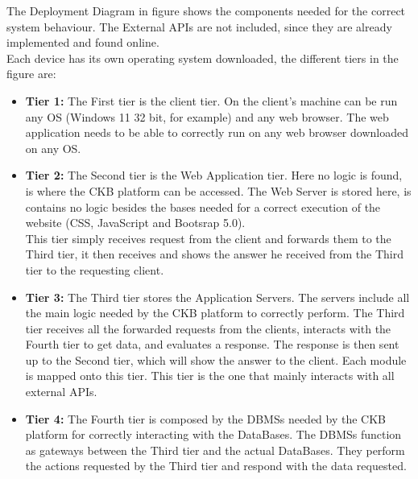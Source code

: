 \documentclass{article}
\begin{document}
{The Deployment Diagram in figure shows the components needed for the correct system behaviour. The External APIs are not included, since they 
are already implemented and found online.\\
Each device has its own operating system downloaded, the different tiers in the figure are:
\begin{itemize}
\item \textbf{Tier 1:} The First tier is the client tier. On the client's machine can be run any OS (Windows 11 32 bit, for example) and any web browser. The web application
needs to be able to correctly run on any web browser downloaded on any OS.\\
\item \textbf{Tier 2:} The Second tier is the Web Application tier. Here no logic is found, is where the CKB platform can be accessed.
The Web Server is stored here, is contains no logic besides the bases needed for a correct execution of the website (CSS, JavaScript and Bootsrap 5.0). \\
This tier simply receives request from the client and forwards them to the Third tier, it then receives and shows the answer he received from the Third tier
to the requesting client. \\
\item \textbf{Tier 3:} The Third tier stores the Application Servers. The servers include all the main logic needed by the CKB platform to correctly perform.
The Third tier receives all the forwarded requests from the clients, interacts with the Fourth tier to get data, and evaluates a response. The response is 
then sent up to the Second tier, which will show the answer to the client. Each module is mapped onto this tier. This tier is the one that mainly interacts
with all external APIs. \\
\item \textbf{Tier 4:} The Fourth tier is composed by the DBMSs needed by the CKB platform for correctly interacting with the DataBases. The DBMSs function as gateways 
between the Third tier and the actual DataBases. They perform the actions requested by the Third tier and respond with the data requested.\\
\end{itemize}
}
\end{document}
